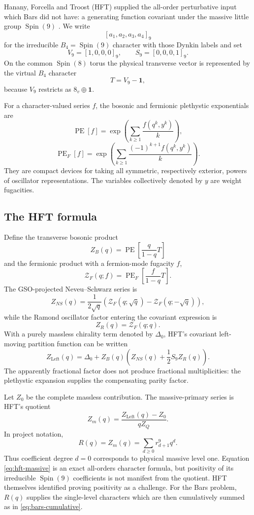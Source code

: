 \documentclass[11pt,a4paper]{article}
\theoremstyle{definition}
\newcommand{\Spin}{\operatorname{Spin}}
\newcommand{\PE}{\operatorname{PE}}
\newcommand{\PEF}{\operatorname{PE}_{F}}
\newcommand{\one}{\mathbf{1}}
\begin{document}
Hanany, Forcella and Troost (HFT) supplied the all-order perturbative input
which Bars did not have: a generating function covariant under the massive
little group $\Spin(9)$ \cite{HFT}.  We write
\[
   [a_1,a_2,a_3,a_4]_9
\]
for the irreducible $B_4=\Spin(9)$ character with those Dynkin labels and set
\[
   V_9=[1,0,0,0]_9,
   \qquad S_9=[0,0,0,1]_9.
\]
On the common $\Spin(8)$ torus the physical transverse vector is represented
by the virtual $B_4$ character
\[
   T=V_9-\one,
\]
because $V_9$ restricts as $8_v\oplus\one$.

For a character-valued series $f$, the bosonic and fermionic plethystic
exponentials are
\[
   \PE[f]=\exp\!\left(\sum_{k\geq1}\frac{f(q^k,y^k)}{k}\right),
\]
\[
   \PEF[f]=\exp\!\left(\sum_{k\geq1}
        \frac{(-1)^{k+1}f(q^k,y^k)}{k}\right).
\]
They are compact devices for taking all symmetric, respectively exterior,
powers of oscillator representations.  The variables collectively denoted
by $y$ are weight fugacities.

\subsection{The HFT formula}

Define the transverse bosonic product
\[
   Z_B(q)=\PE\!\left[\frac{q}{1-q}T\right]
\]
and the fermionic product with a fermion-mode fugacity $f$,
\[
   \mathcal Z_F(q;f)
   =\PEF\!\left[\frac{f}{1-q}T\right].
\]
The GSO-projected Neveu--Schwarz series is
\[
   Z_{NS}(q)=\frac{1}{2\sqrt q}
   \left(\mathcal Z_F(q;\sqrt q)
        -\mathcal Z_F(q;-\sqrt q)\right),
\]
while the Ramond oscillator factor entering the covariant expression is
\[
   Z_R(q)=\mathcal Z_F(q;q).
\]
With a purely massless chirality term denoted by $\Delta_0$, HFT's covariant
left-moving partition function can be written
\begin{equation}
\label{eq:hft-left}
   Z_{\mathrm{Left}}(q)
   =\Delta_0+Z_B(q)
      \left(Z_{NS}(q)+\frac12 S_9 Z_R(q)\right).
\end{equation}
The apparently fractional factor does not produce fractional multiplicities:
the plethystic expansion supplies the compensating parity factor.

Let $Z_0$ be the complete massless contribution.  The massive-primary series
is HFT's quotient
\begin{equation}
\label{eq:hft-massive}
   Z_m(q)=\frac{Z_{\mathrm{Left}}(q)-Z_0}{qZ_Q}.
\end{equation}
In project notation,
\begin{equation}
\label{eq:R-series}
   R(q)=Z_m(q)=\sum_{d\geq0}r_{d+1}^9q^d.
\end{equation}
Thus coefficient degree $d=0$ corresponds to physical massive level one.
Equation \eqref{eq:hft-massive} is an exact all-orders character formula, but
positivity of its irreducible $\Spin(9)$ coefficients is not manifest from
the quotient.  HFT themselves identified proving positivity as a challenge.
For the Bars problem, $R(q)$ supplies the single-level characters which are
then cumulatively summed as in \eqref{eq:bars-cumulative}.
\end{document}
